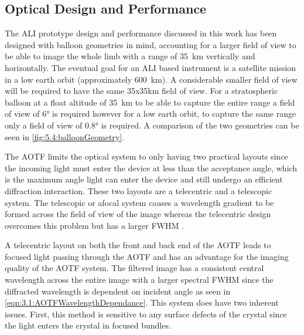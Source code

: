 \documentclass[12pt]{article}
\begin{document}
\subsection{Optical Design and Performance}

The ALI prototype design and performance discussed in this work has been designed with balloon geometries in mind, accounting for a larger field of view to be able to image the whole limb with a range of 35~km vertically and horizontally. The eventual goal for an ALI based instrument is a satellite mission in a low earth orbit (approximately 600~km). A considerable smaller field of view will be required to have the same 35x35km field of view. For a stratospheric balloon at a float altitude of 35~km to be able to capture the entire range a field of view of 6\si{\degree} is required however for a low earth orbit, to capture the same range only a field of view of 0.8\si{\degree} is required. A comparison of the two geometries can be seen in \autoref{fig:5.4:balloonGeometry}.

The AOTF limits the optical system to only having two practical layouts since the incoming light must enter the device at less than the acceptance angle, which is the maximum angle light can enter the device and still undergo an efficient diffraction interaction. These two layouts are a telecentric and a telescopic system. The telescopic or afocal system causes a wavelength gradient to be formed across the field of view of the image whereas the telecentric design overcomes this problem but has a larger FWHM \citep{Suhre2004}.

A telecentric layout on both the front and back end of the AOTF leads to focused light passing through the AOTF and has an advantage for the imaging quality of the AOTF system. The filtered image has a consistent central wavelength across the entire image with a larger spectral FWHM since the diffracted wavelength is dependent on incident angle as seen in \autoref{eqn:3.1:AOTFWavelengthDependance}. This system does have two inherent issues. First, this method is sensitive to any surface defects of the crystal since the light enters the crystal in focused bundles.
\end{document}
